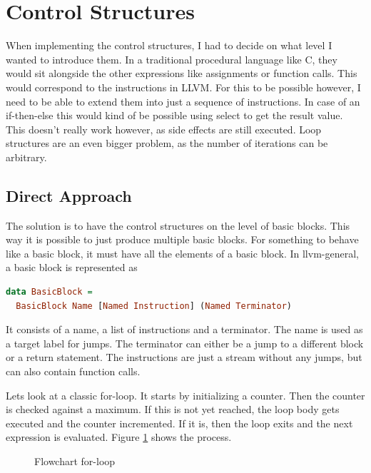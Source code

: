 \documentclass[a4paper,bibliography=totocnumbered,parskip,headsepline]{scrbook}
\begin{document}
\section{Control Structures}
When implementing the control structures, I had to decide on what level I wanted to introduce them.
In a traditional procedural language like C, they would sit alongside the other expressions like assignments or function calls.
This would correspond to the instructions in LLVM.
For this to be possible however, I need to be able to extend them into just a sequence of instructions.
In case of an if-then-else this would kind of be possible using select to get the result value.
This doesn't really work however, as side effects are still executed.
Loop structures are an even bigger problem, as the number of iterations can be arbitrary.

\subsection{Direct Approach}
The solution is to have the control structures on the level of basic blocks.
This way it is possible to just produce multiple basic blocks.
For something to behave like a basic block, it must have all the elements of a basic block.
In llvm-general, a basic block is represented as
\begin{lstlisting}[language=haskell]
data BasicBlock =
  BasicBlock Name [Named Instruction] (Named Terminator)
\end{lstlisting}

It consists of a name, a list of instructions and a terminator.
The name is used as a target label for jumps.
The terminator can either be a jump to a different block or a return statement.
The instructions are just a stream without any jumps, but can also contain function calls.

Lets look at a classic for-loop.
It starts by initializing a counter.
Then the counter is checked against a maximum.
If this is not yet reached, the loop body gets executed and the counter incremented.
If it is, then the loop exits and the next expression is evaluated.
Figure \ref{fig:forchart} shows the process.

\begin{figure}[h]
\begin{center}
\end{center}
\caption{Flowchart for-loop}
\label{fig:forchart}
\end{figure}
\end{document}

